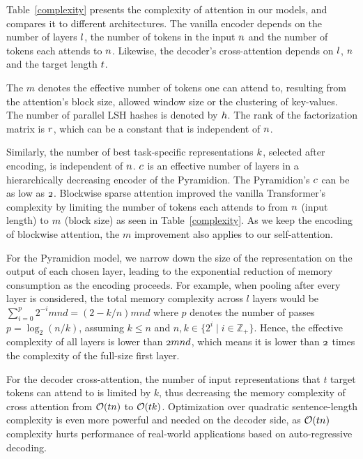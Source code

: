 \documentclass{article}
\newcommand{\ZZ}{\mathbb{Z}}
\begin{document}
  Table~\ref{complexity} presents the complexity of attention in our models, and compares it to different architectures. 
The vanilla encoder depends on the number of layers $\mathnormal{l}$, the number of tokens in the input $\mathnormal{n}$ and the number of tokens each attends to $\mathnormal{n}$. Likewise, the decoder's cross-attention depends on $\mathnormal{l}$, $\mathnormal{n}$ and the target length $\mathnormal{t}$.

 The $m$ denotes the effective number of tokens one can attend to, resulting from the attention's block size, allowed window size or the clustering of key-values. The number of parallel LSH hashes is denoted by $\mathnormal{h}$. The rank of the factorization matrix is $\mathnormal{r}$, which can be a constant that is independent of $\mathnormal{n}$.

Similarly, the number of best task-specific representations $\mathnormal{k}$, selected after encoding, is independent of $\mathnormal{n}$. $\mathnormal{c}$ is an effective number of layers in a hierarchically decreasing encoder of the Pyramidion. The Pyramidion's $\mathnormal{c}$ can be as low as $\mathnormal{2}$.
Blockwise sparse attention improved the vanilla Transformer's complexity by limiting the number of tokens each attends to from $\mathnormal{n}$ (input length) to $\mathnormal{m}$ (block size) as seen in Table~\ref{complexity}. As we keep the encoding of blockwise attention, the $m$ improvement also applies to our self-attention. 

For the Pyramidion model, we narrow down the size of the representation on the output of each chosen layer, leading to the exponential reduction of memory consumption as the encoding proceeds. For example, when pooling after every layer is considered, the total memory complexity across $l$ layers would be $
    \sum_{i=0}^{p} 2^{-i}  m n d
    =   (2-k/n) m n d
$
where $p$ denotes the number of passes $p = \log_2(n/k)$, assuming $k\leq n$ and $n, k \in \{2^i \mid i \in \ZZ_{+}\}$.
Hence, the effective complexity of all layers is lower than $\mathnormal{2 m n d}$, which means it is lower than $\mathnormal{2}$ times the complexity of the full-size first layer.

For the decoder cross-attention, the number of input representations that $t$ target tokens can attend to is limited by $k$, thus decreasing the memory complexity of cross attention from  $\mathnormal{\mathcal{O}(t n)}$ to $\mathnormal{\mathcal{O}(t k)}$. Optimization over quadratic sentence-length complexity is even more powerful and needed on the decoder side, as $\mathnormal{\mathcal{O}(t n)}$ complexity hurts performance of real-world applications based on auto-regressive decoding.
\end{document}
